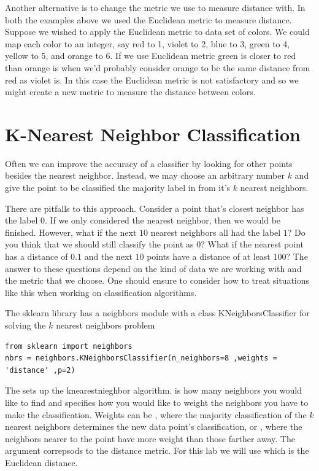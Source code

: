 Another alternative is to change the metric we use to measure distance with. 
In both the examples above we used the Euclidean metric to measure distance. 
Suppose we wished to apply the Euclidean metric to data set of colors.
We could map each color to an integer, say red to 1, violet to 2, blue to 3, green to 4, yellow to 5, and orange to 6. 
If we use Euclidean metric green is closer to red than orange is when we'd probably consider orange to be the same distance from red as violet is. 
In this case the Euclidean metric is not satisfactory and so we might create a new metric to measure the distance between colors. 

\section*{K-Nearest Neighbor Classification}

Often we can improve the accuracy of a classifier by looking for other points besides the nearest neighbor.  
Instead, we may choose an arbitrary number $k$ and give the point to be classified the majority label in from it's $k$ nearest neighbors. 

There are pitfalls to this approach.  
Consider a point that's closest neighbor has the label $0$.  
If we only considered the nearest neighbor, then we would be finished.  
However, what if the next $10$ nearest neighbors all had the label $1$?  
Do you think that we should still classify the point as $0$?  
What if the nearest point has a distance of $0.1$ and the next $10$ points have a distance of at least $100$?  
The answer to these questions depend on the kind of data we are working with and the metric that we choose.  
One should ensure to consider how to treat situations like this when working on classification algorithms.


The sklearn library has a neighbors module with a class KNeighborsClassifier for solving the $k$ nearest neighbors problem
\begin{lstlisting}
from sklearn import neighbors
nbrs = neighbors.KNeighborsClassifier(n_neighbors=8 ,weights = 'distance' ,p=2)
\end{lstlisting}

The  sets up the knearestnieghbor algorithm. 
 is how many neighbors you would like to find and  specifies how you would like to weight the neighbors you have to make the classification. 
Weights can be , where the majority classification of the $k$ nearest neighbors determines the new data point's classification, or , where the neighbors nearer to the point have more weight than those farther away. 
The argument  correpsods to the distance metric. 
For this lab we will use  which is the Euclidean distance.  


